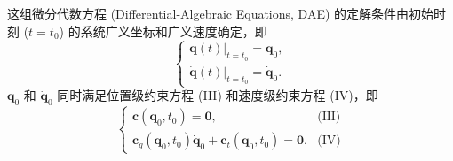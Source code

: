 这组微分代数方程 (Differential-Algebraic Equations, DAE) 的定解条件由初始时刻 ($t = t_0$) 的系统广义坐标和广义速度确定，即
\[
\begin{cases}
        \boldsymbol{q}(t)\big|_{t=t_0} = \boldsymbol{q}_0,\\[4pt]
        \dot{\boldsymbol{q}}(t)\big|_{t=t_0} = \dot{\boldsymbol{q}}_0.
    \end{cases}
\]
$\boldsymbol{q}_0$ 和 $\dot{\boldsymbol{q}}_0$ 同时满足位置级约束方程 (III) 和速度级约束方程 (IV)，即
\[
\begin{cases}
        \boldsymbol{c}(\boldsymbol{q}_0,t_0) = \boldsymbol{0}, & \text{(III)}\\[4pt]
        \boldsymbol{c}_q(\boldsymbol{q}_0,t_0)\dot{\boldsymbol{q}}_0 + \boldsymbol{c}_t(\boldsymbol{q}_0,t_0) = \boldsymbol{0}. & \text{(IV)}
    \end{cases}
\]
